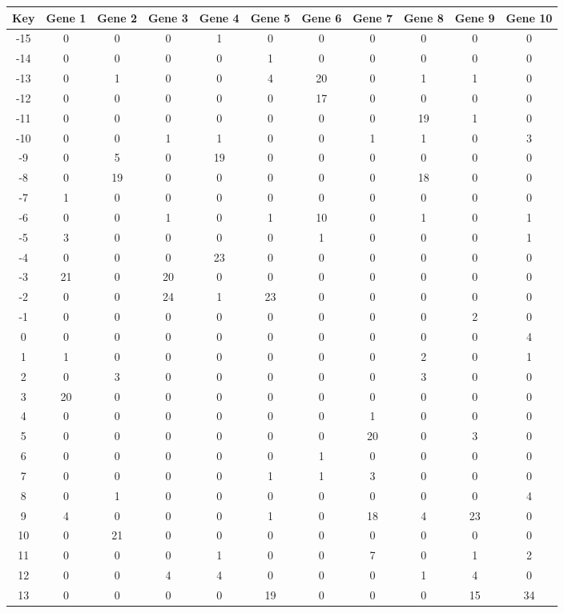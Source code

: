 \begin{tabular}{|c|c|c|c|c|c|c|c|c|c|c|}
\hline
Key & Gene 1 & Gene 2 & Gene 3 & Gene 4 & Gene 5 & Gene 6 & Gene 7 & Gene 8 & Gene 9 & Gene 10 \\
\hline
-15 & 0 & 0 & 0 & 1 & 0 & 0 & 0 & 0 & 0 & 0 \\
-14 & 0 & 0 & 0 & 0 & 1 & 0 & 0 & 0 & 0 & 0 \\
-13 & 0 & 1 & 0 & 0 & 4 & 20 & 0 & 1 & 1 & 0 \\
-12 & 0 & 0 & 0 & 0 & 0 & 17 & 0 & 0 & 0 & 0 \\
-11 & 0 & 0 & 0 & 0 & 0 & 0 & 0 & 19 & 1 & 0 \\
-10 & 0 & 0 & 1 & 1 & 0 & 0 & 1 & 1 & 0 & 3 \\
-9 & 0 & 5 & 0 & 19 & 0 & 0 & 0 & 0 & 0 & 0 \\
-8 & 0 & 19 & 0 & 0 & 0 & 0 & 0 & 18 & 0 & 0 \\
-7 & 1 & 0 & 0 & 0 & 0 & 0 & 0 & 0 & 0 & 0 \\
-6 & 0 & 0 & 1 & 0 & 1 & 10 & 0 & 1 & 0 & 1 \\
-5 & 3 & 0 & 0 & 0 & 0 & 1 & 0 & 0 & 0 & 1 \\
-4 & 0 & 0 & 0 & 23 & 0 & 0 & 0 & 0 & 0 & 0 \\
-3 & 21 & 0 & 20 & 0 & 0 & 0 & 0 & 0 & 0 & 0 \\
-2 & 0 & 0 & 24 & 1 & 23 & 0 & 0 & 0 & 0 & 0 \\
-1 & 0 & 0 & 0 & 0 & 0 & 0 & 0 & 0 & 2 & 0 \\
0 & 0 & 0 & 0 & 0 & 0 & 0 & 0 & 0 & 0 & 4 \\
1 & 1 & 0 & 0 & 0 & 0 & 0 & 0 & 2 & 0 & 1 \\
2 & 0 & 3 & 0 & 0 & 0 & 0 & 0 & 3 & 0 & 0 \\
3 & 20 & 0 & 0 & 0 & 0 & 0 & 0 & 0 & 0 & 0 \\
4 & 0 & 0 & 0 & 0 & 0 & 0 & 1 & 0 & 0 & 0 \\
5 & 0 & 0 & 0 & 0 & 0 & 0 & 20 & 0 & 3 & 0 \\
6 & 0 & 0 & 0 & 0 & 0 & 1 & 0 & 0 & 0 & 0 \\
7 & 0 & 0 & 0 & 0 & 1 & 1 & 3 & 0 & 0 & 0 \\
8 & 0 & 1 & 0 & 0 & 0 & 0 & 0 & 0 & 0 & 4 \\
9 & 4 & 0 & 0 & 0 & 1 & 0 & 18 & 4 & 23 & 0 \\
10 & 0 & 21 & 0 & 0 & 0 & 0 & 0 & 0 & 0 & 0 \\
11 & 0 & 0 & 0 & 1 & 0 & 0 & 7 & 0 & 1 & 2 \\
12 & 0 & 0 & 4 & 4 & 0 & 0 & 0 & 1 & 4 & 0 \\
13 & 0 & 0 & 0 & 0 & 19 & 0 & 0 & 0 & 15 & 34 \\
\hline
\end{tabular}
